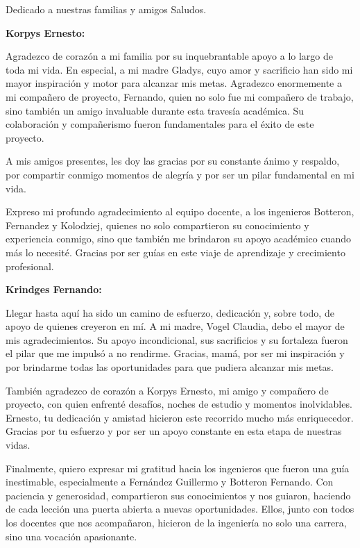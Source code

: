 

\begin{reconocimiento}{Dedicado a nuestras familias y amigos Saludos.}

\textbf{Korpys Ernesto:} \par 
Agradezco de corazón a mi familia por su inquebrantable apoyo a lo largo de toda mi vida. En especial, a mi madre Gladys, cuyo amor y sacrificio han sido mi mayor inspiración y motor para alcanzar mis metas.
Agradezco enormemente a mi compañero de proyecto, Fernando, quien no solo fue mi compañero de trabajo, sino también un amigo invaluable durante esta travesía académica. Su colaboración y compañerismo fueron fundamentales para el éxito de este proyecto.\par
A mis amigos presentes, les doy las gracias por su constante ánimo y respaldo, por compartir conmigo momentos de alegría y por ser un pilar fundamental en mi vida.\par
Expreso mi profundo agradecimiento al equipo docente, a los ingenieros Botteron, Fernandez y Kolodziej, quienes no solo compartieron su conocimiento y experiencia conmigo, sino que también me brindaron su apoyo académico cuando más lo necesité. Gracias por ser guías en este viaje de aprendizaje y crecimiento profesional. \par 

\textbf{Krindges Fernando:} \par 
Llegar hasta aquí ha sido un camino de esfuerzo, dedicación y, sobre todo, de apoyo de quienes creyeron en mí. A mi madre, Vogel Claudia, debo el mayor de mis agradecimientos. Su apoyo incondicional, sus sacrificios y su fortaleza fueron el pilar que me impulsó a no rendirme. Gracias, mamá, por ser mi inspiración y por brindarme todas las oportunidades para que pudiera alcanzar mis metas.\par 

También agradezco de corazón a Korpys Ernesto, mi amigo y compañero de proyecto, con quien enfrenté desafíos, noches de estudio y momentos inolvidables. Ernesto, tu dedicación y amistad hicieron este recorrido mucho más enriquecedor. Gracias por tu esfuerzo y por ser un apoyo constante en esta etapa de nuestras vidas.\par 

Finalmente, quiero expresar mi gratitud hacia los ingenieros que fueron una guía inestimable, especialmente a Fernández Guillermo y Botteron Fernando. Con paciencia y generosidad, compartieron sus conocimientos y nos guiaron, haciendo de cada lección una puerta abierta a nuevas oportunidades. Ellos, junto con todos los docentes que nos acompañaron, hicieron de la ingeniería no solo una carrera, sino una vocación apasionante.\par 
\end{reconocimiento}